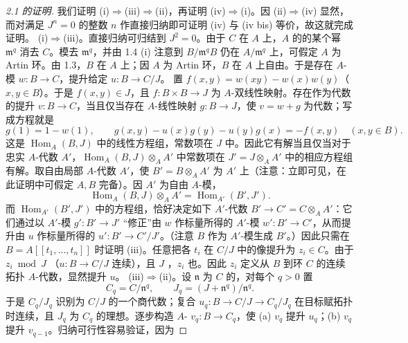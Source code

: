 \begin{proof}[2.1 的证明]
我们证明 (i)$\Rightarrow$(iii)$\Rightarrow$(ii)，再证明 (iv)$\Rightarrow$(i)。因 (ii)$\Rightarrow$(iv) 显然，而对满足 $J^n=0$ 的整数 $n$ 作直接归纳即可证明 (iv) 与 (iv bis) 等价，故这就完成证明。
(i)$\Rightarrow$(iii)。直接归纳可归结到 $J^2=0$。由于 $C$ 在 $A$ 上，$A$ 的的某个幂 $\mathfrak m^q$ 消去 $C$。模去 $\mathfrak m^q$，并由 1.4 (i) 注意到 $B/\mathfrak m^qB$ 仍在 $A/\mathfrak m^q$ 上，可假定 $A$ 为 Artin 环。由 1.3，$B$ 在 $A$ 上；因 $A$ 为 Artin 环，$B$ 在 $A$ 上自由。于是存在 $A$-模 $w:B\to C$，提升给定 $u:B\to C/J$。
置 $f(x,y)=w(xy)-w(x)w(y)$（$x,y\in B$）。于是 $f(x,y)\in J$，且 $f:B\times B\to J$ 为 $A$-双线性映射。存在作为代数的提升 $v:B\to C$，当且仅当存在 $A$-线性映射 $g:B\to J$，使 $v=w+g$ 为代数；写成方程就是
\[g(1)=1-w(1),\qquad g(x,y)-u(x)g(y)-u(y)g(x)=-f(x,y)\quad(x,y\in B).\]
这是 $\operatorname{Hom}_A(B,J)$ 中的线性方程组，常数项在 $J$ 中。因此它有解当且仅当对于忠实 $A$-代数 $A'$，$\operatorname{Hom}_A(B,J)\otimes_A A'$ 中常数项在 $J'=J\otimes_A A'$ 中的相应方程组有解。取自由局部 $A$-代数 $A'$，使 $B'=B\otimes_A A'$ 为 $A'$ 上（注意：立即可见，在此证明中可假定 $A,B$ 完备）。因 $A'$ 为自由 $A$-模，
\[\operatorname{Hom}_A(B,J)\otimes_A A'=\operatorname{Hom}_{A'}(B',J').\]
而 $\operatorname{Hom}_{A'}(B',J')$ 中的方程组，恰好决定如下 $A'$-代数 $B'\to C'=C\otimes_A A'$：它们通过以 $A'$-模 $g':B'\to J'$ “修正”由 $w$ 作标量所得的 $A'$-模 $w':B'\to C'$，从而提升由 $u$ 作标量所得的 $u':B'\to C'/J'$。（注意 $B$ 作为 $A'$-模生成 $B'$。）因此只需在 $B=A[[t_1,\ldots,t_n]]$ 时证明 (iii)。任意把各 $t_i$ 在 $C/J$ 中的像提升为 $z_i\in C$。由于 $z_i\bmod J$ （$u:B\to C/J$ 连续），且 $J$ ，$z_i$ 也。因此 $z_i$ 定义从 $B$ 到环 $C$ 的连续拓扑 $A$-代数，显然提升 $u$。
(iii)$\Rightarrow$(ii)。设 $\mathfrak n$ 为 $C$ 的，对每个 $q>0$ 置
\[C_q=C/\mathfrak n^q,\qquad J_q=(J+\mathfrak n^q)/\mathfrak n^q.\]
于是 $C_q/J_q$ 识别为 $C/J$ 的一个商代数；复合 $u_q:B\to C/J\to C_q/J_q$ 在目标赋拓扑时连续，且 $J_q$ 为 $C_q$ 的理想。逐步构造 $A$- $v_q:B\to C_q$，使 (a) $v_q$ 提升 $u_q$；(b) $v_q$ 提升 $v_{q-1}$。归纳可行性容易验证，因为

\end{proof}
